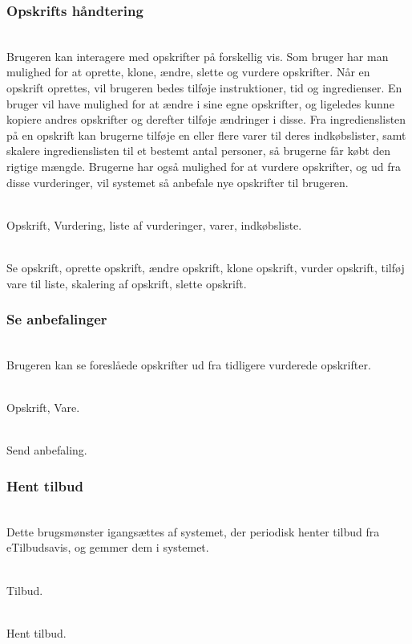 \subsubsection{Opskrifts håndtering}
\begin{description}[font=\normalfont\itshape]
\item[Brugsmønster]\hfill\\
Brugeren kan interagere med opskrifter på forskellig vis. 
Som bruger har man mulighed for at oprette, klone, ændre, slette og vurdere opskrifter.
Når en opskrift oprettes, vil brugeren bedes tilføje instruktioner, tid og ingredienser.
En bruger vil have mulighed for at ændre i sine egne opskrifter, og ligeledes kunne kopiere andres opskrifter og derefter tilføje ændringer i disse.
Fra ingredienslisten på en opskrift kan brugerne tilføje en eller flere varer til deres indkøbslister, samt skalere ingredienslisten til et bestemt antal personer, så brugerne får købt den rigtige mængde.
Brugerne har også mulighed for at vurdere opskrifter, og ud fra disse vurderinger, vil systemet så anbefale nye opskrifter til brugeren.
\item[Objekter]\hfill\\
Opskrift, Vurdering, liste af vurderinger, varer, indkøbsliste.
\item[Funktioner]\hfill\\
Se opskrift, oprette opskrift, ændre opskrift, klone opskrift, vurder opskrift, tilføj vare til liste, skalering af opskrift, slette opskrift.
\end{description}

\subsubsection*{Se anbefalinger}
\begin{description}[font=\normalfont\itshape]
\item[Brugsmønster]\hfill\\
Brugeren kan se foreslåede opskrifter ud fra tidligere vurderede opskrifter.
\item[Objekter]\hfill\\
Opskrift, Vare.
\item[Funktioner]\hfill\\
Send anbefaling.
\end{description}

\subsubsection{Hent tilbud}
\begin{description}[font=\normalfont\itshape]
\item[Brugsmønster]\hfill\\
Dette brugsmønster igangsættes af systemet, der periodisk henter tilbud fra eTilbudsavis, og gemmer dem i systemet.
\item[Objekter]\hfill\\
Tilbud.
\item[Funktioner]\hfill\\
Hent tilbud.
\end{description}
